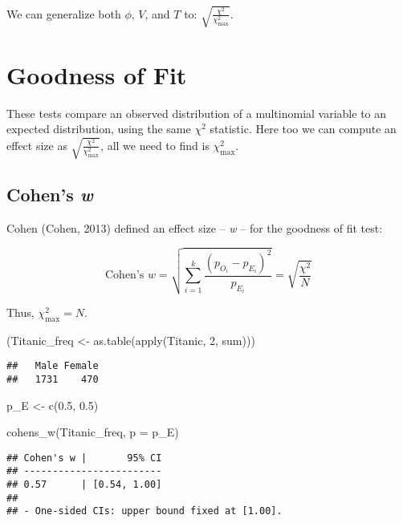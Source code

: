 \documentclass[
]{article}
\newenvironment{Shaded}{\begin{snugshade}}{\end{snugshade}}
\newcommand{\AttributeTok}[1]{\textcolor[rgb]{0.77,0.63,0.00}{#1}}
\newcommand{\DecValTok}[1]{\textcolor[rgb]{0.00,0.00,0.81}{#1}}
\newcommand{\FloatTok}[1]{\textcolor[rgb]{0.00,0.00,0.81}{#1}}
\newcommand{\FunctionTok}[1]{\textcolor[rgb]{0.00,0.00,0.00}{#1}}
\newcommand{\NormalTok}[1]{#1}
\newcommand{\OtherTok}[1]{\textcolor[rgb]{0.56,0.35,0.01}{#1}}
\begin{document}
We can generalize both \(\phi\), \(V\), and \(T\) to:
\(\sqrt{\frac{\chi^2}{\chi^2_{\text{max}}}}\).

\hypertarget{goodness-of-fit}{%
\section{Goodness of Fit}\label{goodness-of-fit}}

These tests compare an observed distribution of a multinomial variable
to an expected distribution, using the same \(\chi^2\) statistic. Here
too we can compute an effect size as
\(\sqrt{\frac{\chi^2}{\chi^2_{\text{max}}}}\), all we need to find is
\(\chi^2_{\text{max}}\).

\hypertarget{cohens-w}{%
\subsection{\texorpdfstring{Cohen's
\emph{w}}{Cohen's w}}\label{cohens-w}}

Cohen (Cohen, 2013) defined an effect size -- \emph{w} -- for the
goodness of fit test:

\[
\text{Cohen's } w = \sqrt{\sum_{i=1}^{k}{\frac{(p_{O_i}-p_{E_i})^2}{p_{E_i}}}} = \sqrt{\frac{\chi^2}{N}}
\]

Thus, \(\chi^2_\text{max} = N\).

\begin{Shaded}
\begin{Highlighting}[]
\NormalTok{(Titanic\_freq }\OtherTok{\textless{}{-}} \FunctionTok{as.table}\NormalTok{(}\FunctionTok{apply}\NormalTok{(Titanic, }\DecValTok{2}\NormalTok{, sum)))}
\end{Highlighting}
\end{Shaded}

\begin{verbatim}
##   Male Female 
##   1731    470
\end{verbatim}

\begin{Shaded}
\begin{Highlighting}[]
\NormalTok{p\_E }\OtherTok{\textless{}{-}} \FunctionTok{c}\NormalTok{(}\FloatTok{0.5}\NormalTok{, }\FloatTok{0.5}\NormalTok{)}

\FunctionTok{cohens\_w}\NormalTok{(Titanic\_freq, }\AttributeTok{p =}\NormalTok{ p\_E)}
\end{Highlighting}
\end{Shaded}

\begin{verbatim}
## Cohen's w |       95% CI
## ------------------------
## 0.57      | [0.54, 1.00]
## 
## - One-sided CIs: upper bound fixed at [1.00].
\end{verbatim}
\end{document}
